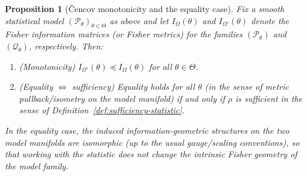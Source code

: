 \documentclass[11pt]{article}
\newtheorem{proposition}{Proposition}
\newcommand{\Pcal}{\mathcal{P}}
\begin{document}
\begin{proposition}[Čencov monotonicity and the equality case]
\label{prop:cencov-equality-sufficiency}
Fix a smooth statistical model $(\Pcal_\theta)_{\theta\in\Theta}$ as above and
let $I_\Omega(\theta)$ and $I_{\Omega'}(\theta)$ denote the Fisher information
matrices (or Fisher metrics) for the families $(\Pcal_\theta)$ and
$(\mathcal Q_\theta)$, respectively.  Then:
\begin{enumerate}[label=(\alph*),leftmargin=1.8em]
\item (\emph{Monotonicity}) $I_{\Omega'}(\theta)\preceq I_{\Omega}(\theta)$ for all
$\theta\in\Theta$.
\item (\emph{Equality $\Leftrightarrow$ sufficiency}) Equality holds for all
$\theta$ (in the sense of metric pullback/isometry on the model manifold) if and
only if $\rho$ is sufficient in the sense of
Definition~\ref{def:sufficiency-statistic}.
\end{enumerate}
In the equality case, the induced information-geometric structures on the two
model manifolds are isomorphic (up to the usual gauge/scaling conventions), so
that working with the statistic does not change the intrinsic Fisher geometry of
the model family.
\end{proposition}
\end{document}
